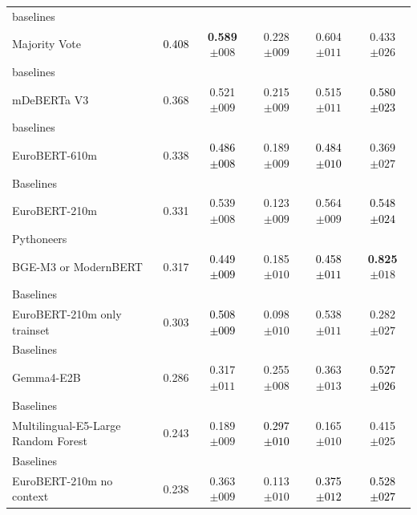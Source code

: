 \begin{tabularx}{\textwidth}{X | c c c c c}
baselines\\\subcatarrow{}Majority Vote & \textcolor{Black}{0.408} & \textbf{\textcolor{White!50!BrickRed}{0.589$\pm{}008$}} & \textcolor{White!50!NavyBlue}{0.228$\pm{}009$} & \textcolor{White!50!BrickRed}{0.604$\pm{}011$} & \textcolor{White!50!NavyBlue}{0.433$\pm{}026$} \\
baselines\\\subcatarrow{}mDeBERTa V3 & \textcolor{White!50!NavyBlue}{0.368} & \textcolor{White!50!BrickRed}{0.521$\pm{}009$} & \textcolor{White!50!NavyBlue}{0.215$\pm{}009$} & \textcolor{White!50!BrickRed}{0.515$\pm{}011$} & \textcolor{Black}{0.580$\pm{}023$} \\
baselines\\\subcatarrow{}EuroBERT-610m & \textcolor{White!50!NavyBlue}{0.338} & \textcolor{Black}{0.486$\pm{}008$} & \textcolor{White!50!NavyBlue}{0.189$\pm{}009$} & \textcolor{Black}{0.484$\pm{}010$} & \textcolor{White!50!NavyBlue}{0.369$\pm{}027$} \\
Baselines\\\subcatarrow{}EuroBERT-210m & \textcolor{White!50!NavyBlue}{0.331} & \textcolor{White!50!BrickRed}{0.539$\pm{}008$} & \textcolor{NavyBlue}{0.123$\pm{}009$} & \textcolor{White!50!BrickRed}{0.564$\pm{}009$} & \textcolor{Black}{0.548$\pm{}024$} \\
Pythoneers\\\subcatarrow{}BGE-M3 or ModernBERT & \textcolor{White!50!NavyBlue}{0.317} & \textcolor{Black}{0.449$\pm{}009$} & \textcolor{White!50!NavyBlue}{0.185$\pm{}010$} & \textcolor{Black}{0.458$\pm{}011$} & \textbf{\textcolor{BrickRed}{0.825$\pm{}018$}} \\
Baselines\\\subcatarrow{}EuroBERT-210m only trainset & \textcolor{White!50!NavyBlue}{0.303} & \textcolor{Black}{0.508$\pm{}009$} & \textcolor{NavyBlue}{0.098$\pm{}010$} & \textcolor{White!50!BrickRed}{0.538$\pm{}011$} & \textcolor{NavyBlue}{0.282$\pm{}027$} \\
Baselines\\\subcatarrow{}Gemma4-E2B & \textcolor{NavyBlue}{0.286} & \textcolor{White!50!NavyBlue}{0.317$\pm{}011$} & \textcolor{White!50!NavyBlue}{0.255$\pm{}008$} & \textcolor{White!50!NavyBlue}{0.363$\pm{}013$} & \textcolor{Black}{0.527$\pm{}026$} \\
Baselines\\\subcatarrow{}Multilingual-E5-Large Random Forest & \textcolor{NavyBlue}{0.243} & \textcolor{NavyBlue}{0.189$\pm{}009$} & \textcolor{Black}{0.297$\pm{}010$} & \textcolor{NavyBlue}{0.165$\pm{}010$} & \textcolor{White!50!NavyBlue}{0.415$\pm{}025$} \\
Baselines\\\subcatarrow{}EuroBERT-210m no context & \textcolor{NavyBlue}{0.238} & \textcolor{White!50!NavyBlue}{0.363$\pm{}009$} & \textcolor{NavyBlue}{0.113$\pm{}010$} & \textcolor{Black}{0.375$\pm{}012$} & \textcolor{Black}{0.528$\pm{}027$} \\
\hline
\end{tabularx}